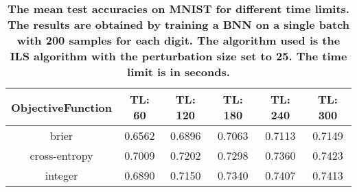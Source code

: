 \begin{center}
\begin{table}[!tb]
\centering
\begin{tabular}{|c|c|c|c|c|c|}
  \hline
ObjectiveFunction & TL: 60 & TL: 120 & TL: 180 & TL: 240 & TL: 300 \\ 
  \hline
brier & 0.6562 & 0.6896 & 0.7063 & 0.7113 & 0.7149 \\ 
   \hline
cross-entropy & 0.7009 & 0.7202 & 0.7298 & 0.7360 & 0.7423 \\ 
   \hline
integer & 0.6890 & 0.7150 & 0.7340 & 0.7407 & 0.7413 \\ 
   \hline
\end{tabular}
\caption{\small{\textbf{The mean test accuracies on MNIST for different time limits. The results are obtained by training a 
            BNN on a single batch with 200 samples for each digit. The algorithm used is the ILS algorithm
            with the perturbation size set to 25. The time limit is in seconds.}}} 
\label{SBT_TETL}
\end{table}

\end{center}
